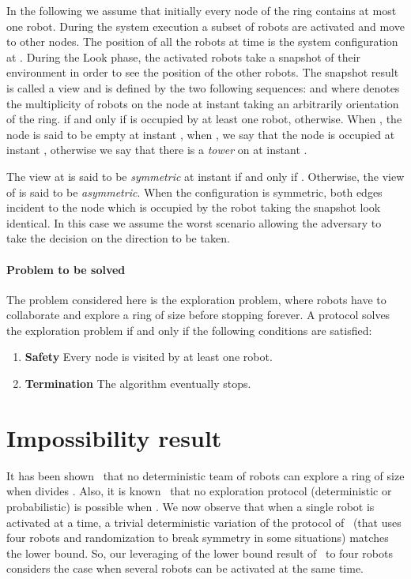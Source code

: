 \documentclass[12pt]{llncs}
\begin{document}
In the following we assume that initially every node  of the ring contains at most one robot. During the system execution a subset of robots are activated and move to other nodes. The position of all the robots at time  is the system configuration at . During the Look phase, the activated robots take a snapshot of their environment in order to see the position of the other robots. The snapshot result is called a view and is defined by the two following sequences:   and  where  denotes the multiplicity of robots on the node  at instant  taking an arbitrarily orientation of the ring.   if and only if  is occupied by at least one robot,  otherwise. When , the node  is said to be empty at instant , when , we say that the node  is occupied at instant , otherwise we say that there is a \textit{tower} on  at instant . 


The view at  is said to be \textit{symmetric} at instant  if and only if . Otherwise, the view of  is said to be \textit{asymmetric}. When the configuration is symmetric, both edges incident to the node  which is occupied by the robot taking the snapshot look identical. In this case we assume the worst scenario allowing the adversary to take the decision on the direction to be taken. 




\paragraph{\textbf{Problem to be solved}}\label{sec:problem}

The problem considered here is the exploration problem, where  robots have to collaborate and explore a ring of size  before stopping forever. A protocol  solves the exploration problem if and only if the following conditions are satisfied:
\begin{enumerate}
\item{\textbf{Safety}} Every node is visited by at least one robot.
\item {\textbf{Termination}} The algorithm eventually stops.
\end{enumerate}

               
\section{Impossibility result}

It has been shown~\cite{davi07} that no deterministic team of  robots can explore a ring of size  when  divides . Also, it is known~\cite{stap09} that no exploration protocol (deterministic or probabilistic) is possible when . We now observe that when a single robot is activated at a time, a trivial deterministic variation of the protocol of~\cite{stap09} (that uses four robots and randomization to break symmetry in some situations) matches the lower bound. So, our leveraging of the lower bound result of~\cite{stap09} to four robots considers the case when several robots can be activated at the same time.
\end{document}
